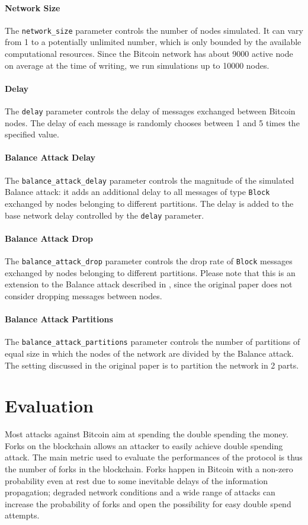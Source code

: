 \paragraph{Network Size}
The \texttt{network\_size} parameter controls the number of nodes simulated.
It can vary from \num{1} to a potentially unlimited number, which is only bounded by the available computational resources.
Since the Bitcoin network has about \num{9000} active node on average at the time of writing, we run simulations up to \num{10000} nodes.

\paragraph{Delay}
The \texttt{delay} parameter controls the delay of messages exchanged between Bitcoin nodes.
The delay of each message is randomly chooses between \num{1} and \num{5} times the specified value.

\paragraph{Balance Attack Delay}
The \texttt{balance\_attack\_delay} parameter controls the magnitude of the simulated Balance attack:
it adds an additional delay to all messages of type \texttt{Block} exchanged by nodes belonging to different partitions.
The delay is added to the base network delay controlled by the \texttt{delay} parameter.

\paragraph{Balance Attack Drop}
The \texttt{balance\_attack\_drop} parameter controls the drop rate of \texttt{Block} messages exchanged by nodes belonging to different partitions.
Please note that this is an extension to the Balance attack described in \cite{balance_attack_2017}, since the original paper does not consider dropping messages between nodes.

\paragraph{Balance Attack Partitions}
The \texttt{balance\_attack\_partitions} parameter controls the number of partitions of equal size in which the nodes of the network are divided by the Balance attack.
The setting discussed in the original paper is to partition the network in \num{2} parts.


\section{Evaluation}
Most attacks against Bitcoin aim at spending the double spending the money.
Forks on the blockchain allows an attacker to easily achieve double spending attack.
The main metric used to evaluate the performances of the protocol is thus the number of forks in the blockchain.
Forks happen in Bitcoin with a non-zero probability even at rest due to some inevitable delays of the information propagation;
degraded network conditions and a wide range of attacks can increase the probability of forks and open the possibility for easy double spend attempts.


